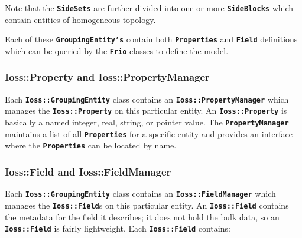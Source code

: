 \documentclass[11pt,twoside]{article}
\newcommand{\code}[1]
   {\mbox{\bf\tt #1}\null}
\begin{document}
Note that the \code{SideSets} are further divided into one or more
\code{SideBlocks} which contain entities of homogeneous topology.

Each of these \code{GroupingEntity's} contain both
\code{Properties} and \code{Field} definitions
which can be queried by the \code{Frio} classes to define the
model.

\subsubsection{Ioss::Property and Ioss::PropertyManager}
Each \code{Ioss::GroupingEntity} class contains an
\code{Ioss::PropertyManager} which manages the
\code{Ioss::Property} on this particular entity. An
\code{Ioss::Property} is basically a named integer, real,
string, or pointer value. The \code{PropertyManager}
maintains a list of all \code{Properties} for a specific
entity and provides an interface where the \code{Properties}
can be located by name.

\subsubsection{Ioss::Field and Ioss::FieldManager}
Each \code{Ioss::GroupingEntity} class contains an
\code{Ioss::FieldManager} which manages the
\code{Ioss::Field}s on this particular entity. An
\code{Ioss::Field} contains the metadata for the field it
describes; it does not hold the bulk data, so an
\code{Ioss::Field} is fairly lightweight. Each
\code{Ioss::Field} contains:
\end{document}
